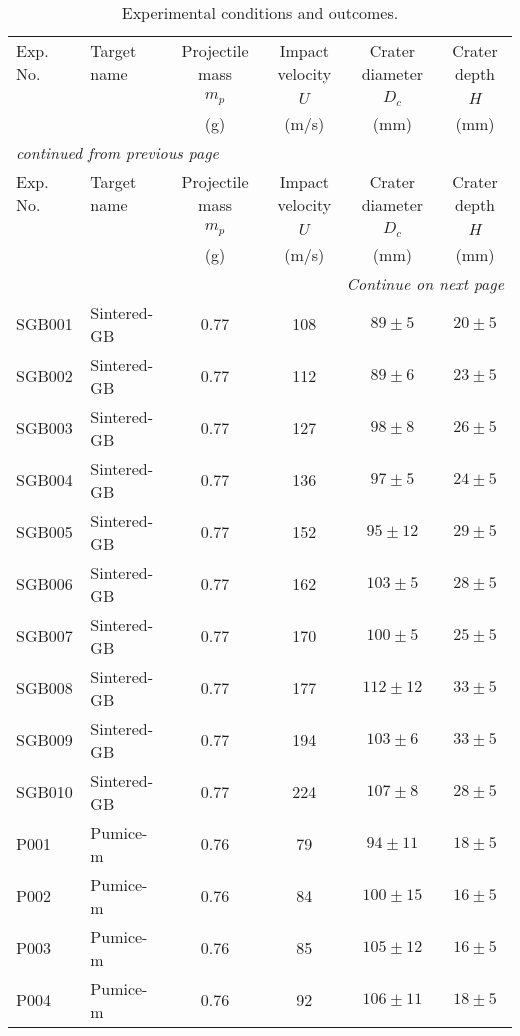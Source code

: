 \documentclass[3p,authoryear]{elsarticle}
\begin{document}
 {\footnotesize
	\begin{longtable}[c]{ll|cccc}
	\caption{Experimental conditions and outcomes. \label{exp-summary}}\\
	\hline
	Exp. No. & Target name&Projectile mass& Impact velocity & Crater diameter &Crater depth \\
	& &$m_p$& $U$ & $D_c$ &  $H$ \\
	& & (g)& (m/s) & (mm)& (mm) \\ \hline
	\endfirsthead
	\multicolumn{6}{l}{{ \it continued from previous page}}\\ \hline
	Exp. No. & Target name &Projectile mass& Impact velocity & Crater diameter &Crater depth \\
	& &$m_p$& $U$ & $D_c$ &  $H$ \\
	& & (g)& (m/s) & (mm)& (mm) \\ \hline
	\endhead
	\hline \multicolumn{6}{r}{{ \it Continue on next page}} \\ \hline
	\endfoot
	\endlastfoot
	SGB001& Sintered-GB & 0.77 & 108 & $89\pm 5$ & $20\pm 5$\\
	SGB002& Sintered-GB & 0.77 & 112 & $89 \pm 6$ & $23\pm5$\\
	SGB003& Sintered-GB & 0.77 & 127 & $98 \pm 8$ & $26\pm 5$\\
	SGB004& Sintered-GB & 0.77 & 136 & $97\pm 5$ & $24\pm5$\\
	SGB005& Sintered-GB & 0.77 & 152 & $95 \pm12$ & $29\pm5$\\
	SGB006& Sintered-GB & 0.77 & 162 & $103\pm 5$ & $28\pm5$ \\
	SGB007& Sintered-GB & 0.77 & 170 & $100 \pm 5$ & $25 \pm5$\\
	SGB008& Sintered-GB & 0.77 & 177 & $112\pm12$ & $33 \pm5$ \\
	SGB009& Sintered-GB & 0.77 & 194 & $103 \pm 6$ & $33\pm 5$ \\
	SGB010& Sintered-GB & 0.77 & 224 & $107 \pm 8$ & $28 \pm 5$\\ \hline
	P001&Pumice-m & 0.76 & 79 & $94 \pm 11$ &$18 \pm 5 $\\
	P002&Pumice-m & 0.76 & 84 & $100 \pm15$ &$16 \pm 5 $\\
	P003&Pumice-m & 0.76 & 85 & $105 \pm12 $&$16 \pm 5 $\\
	P004&Pumice-m & 0.76 & 92 & $106 \pm 11$ & $18 \pm5 $\\

\end{longtable}}
\end{document}
